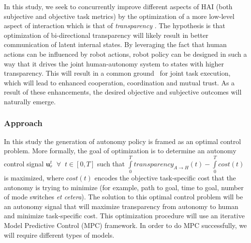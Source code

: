 \documentclass[12pt]{article}
\begin{document}

In this study, we seek to concurrently improve
different aspects of HAI (both subjective and objective task metrics) by the optimization of a more low-level aspect of interaction which is that of \textit{transparency} . The hypothesis is that optimization of bi-directional transparency will likely result in better communication of latent internal states. By leveraging the fact that human actions can be influenced by robot actions, robot policy can be designed in such a way that it drives the joint human-autonomy system to states with higher transparency. This will result in a common ground~\cite{kiesler2005fostering} for joint task execution, which will lead to enhanced cooperation, coordination and mutual trust. As a result of these enhancements, the desired objective and subjective outcomes will naturally emerge.




\subsubsection{Approach}
In this study the generation of autonomy policy is framed as an optimal control problem. More formally, the goal of optimization is to determine an autonomy control signal 
$\boldsymbol{u}_r^t \;\;\forall \;\; t \in [0, T]$ such that $ \int\limits_{0}^{T} transparency_{A \rightarrow H}(t)-\int\limits_{0}^{T}cost(t)$ is maximized, where $cost(t)$ encodes the objective task-specific cost that the autonomy is trying to minimize (for example, path to goal, time to goal, number of mode switches \textit{et cetera}). The solution to this optimal control problem will be an autonomy signal that will maximize transparency from autonomy to human and minimize task-specific cost. This optimization procedure will use an iterative Model Predictive Control (MPC) framework. In order to do MPC successfully, we will require different types of models. 
\end{document}
